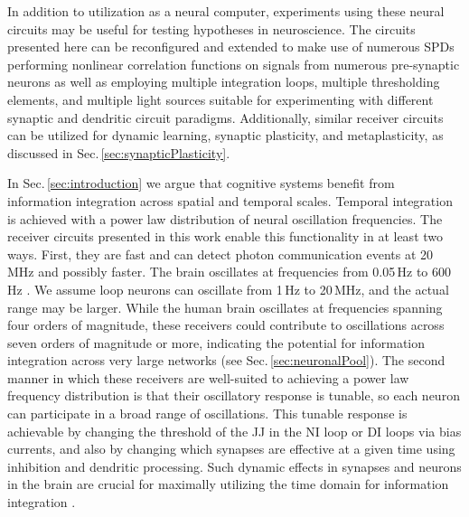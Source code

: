\documentclass[twocolumn]{article}
\begin{document}
In addition to utilization as a neural computer, experiments using these neural circuits may be useful for testing hypotheses in neuroscience. The circuits presented here can be reconfigured and extended to make use of numerous SPDs performing nonlinear correlation functions on signals from numerous pre-synaptic neurons as well as employing multiple integration loops, multiple thresholding elements, and multiple light sources suitable for experimenting with different synaptic and dendritic circuit paradigms. Additionally, similar receiver circuits can be utilized for dynamic learning, synaptic plasticity, and metaplasticity, as discussed in Sec.\,\ref{sec:synapticPlasticity}.

In Sec.\,\ref{sec:introduction} we argue that cognitive systems benefit from information integration across spatial and temporal scales. Temporal integration is achieved with a power law distribution of neural oscillation frequencies. The receiver circuits presented in this work enable this functionality in at least two ways. First, they are fast and can detect photon communication events at 20 MHz and possibly faster. The brain oscillates at frequencies from 0.05\,Hz to 600\,Hz \cite{budr2004}. We assume loop neurons can oscillate from 1\,Hz to 20\,MHz, and the actual range may be larger. While the human brain oscillates at frequencies spanning four orders of magnitude, these receivers could contribute to oscillations across seven orders of magnitude or more, indicating the potential for information integration across very large networks \cite{stsa2000} (see Sec.\,\ref{sec:neuronalPool}). The second manner in which these receivers are well-suited to achieving a power law frequency distribution is that their oscillatory response is tunable, so each neuron can participate in a broad range of oscillations. This tunable response is achievable by changing the threshold of the JJ in the NI loop or DI loops via bias currents, and also by changing which synapses are effective at a given time using inhibition and dendritic processing. Such dynamic effects in synapses and neurons in the brain are crucial for maximally utilizing the time domain for information integration \cite{bu2006}.
\end{document}
